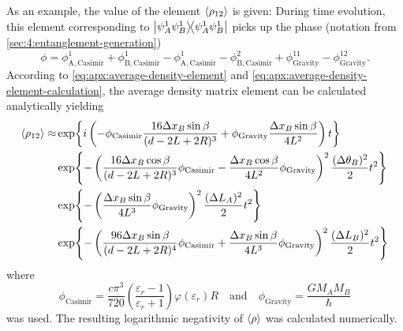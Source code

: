 As an example, the value of the element $\left\langle\rho_{12}\right\rangle$ is given:
During time evolution, this element corresponding to $\ketbra{\psi_A^1\psi_B^1}{\psi_A^1\psi_B^1}$ picks up the phase (notation from \cref{sec:4:entanglement-generation})
\begin{equation}
  \phi = \phi^1_\mathrm{A,Casimir} + \phi^1_\mathrm{B,Casimir} - \phi^1_\mathrm{A,Casimir} - \phi^2_\mathrm{B,Casimir} + \phi^{11}_\mathrm{Gravity} - \phi^{12}_\mathrm{Gravity} .
\end{equation}
According to \eqref{eq:apx:average-density-element} and \eqref{eq:apx:average-density-element-calculation}, the average density matrix element can be calculated analytically yielding
\begin{align} \label{eq:apx:averagted-state-element}
  \left\langle\rho_{12}\right\rangle \approx & \exp{i \left( -\phi_\mathrm{Casimir}\frac{16\Delta x_B \sin\beta}{(d-2L+2R)^3} + \phi_\mathrm{Gravity}\frac{\Delta x_B\sin\beta}{4L^2} \right) t} \\
  & \exp{-\left(\frac{16\Delta x_B \cos\beta}{(d-2L+2R)^3}\phi_\mathrm{Casimir} - \frac{\Delta x_B \cos\beta}{4L^2}\phi_\mathrm{Gravity}\right)^2 \frac{(\Delta \theta_B)^2}{2} t^2} \\
  & \exp{-\left(\frac{\Delta x_B \sin\beta}{4L^3}\phi_\mathrm{Gravity}\right)^2 \frac{(\Delta L_A)^2}{2} t^2} \\
  & \exp{-\left(\frac{96\Delta x_B \sin\beta}{(d-2L+2R)^4}\phi_\mathrm{Casimir} + \frac{\Delta x_B \sin\beta}{4L^3}\phi_\mathrm{Gravity}\right)^2 \frac{(\Delta L_B)^2}{2} t^2}
\end{align}
where
\begin{equation}
  \phi_\mathrm{Casimir} = \frac{c \pi^3}{720} \left(\frac{\varepsilon_r-1}{\varepsilon_r+1}\right) \varphi(\varepsilon_r) R
  \quad \text{and}\quad 
  \phi_\mathrm{Gravity} = \frac{GM_AM_B}{\hbar}
\end{equation}
was used.
The resulting logarithmic negativity of $\left\langle\rho\right\rangle$ was calculated numerically.

